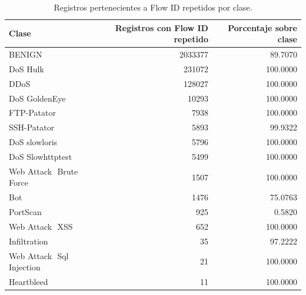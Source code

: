 \begin{table}
\caption{Registros pertenecientes a Flow ID repetidos por clase.}
\label{tab:flowid_repetidos_clase}
\begin{tabular}{lrr}
\toprule
Clase & Registros con Flow ID repetido & Porcentaje sobre clase \\
\midrule
BENIGN & 2033377 & 89.7070 \\
DoS Hulk & 231072 & 100.0000 \\
DDoS & 128027 & 100.0000 \\
DoS GoldenEye & 10293 & 100.0000 \\
FTP-Patator & 7938 & 100.0000 \\
SSH-Patator & 5893 & 99.9322 \\
DoS slowloris & 5796 & 100.0000 \\
DoS Slowhttptest & 5499 & 100.0000 \\
Web Attack  Brute Force & 1507 & 100.0000 \\
Bot & 1476 & 75.0763 \\
PortScan & 925 & 0.5820 \\
Web Attack  XSS & 652 & 100.0000 \\
Infiltration & 35 & 97.2222 \\
Web Attack  Sql Injection & 21 & 100.0000 \\
Heartbleed & 11 & 100.0000 \\
\bottomrule
\end{tabular}
\end{table}
